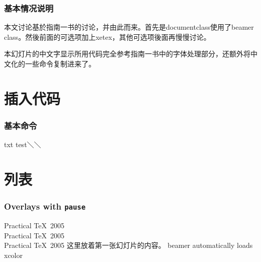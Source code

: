 \documentclass[xetex,aspectratio=169]{mybeamer}
\begin{document}
%
%
%


\begin{frame}
\frametitle{基本情况说明}
本文讨论基於\XeLaTeX 指南一书的讨论，并由此而来。首先是documentclass使用了beamer class。然後前面的可选项加上xetex，其他可选项後面再慢慢讨论。 

本幻灯片的中文字显示所用代码完全参考\XeLaTeX 指南一书中的字体处理部分，还额外将中文化的一些命令复制进来了。
\end{frame}

\section{插入代码}
\begin{frame}[fragile]
\frametitle{基本命令}
\begin{xverbatim}{txt}
test＼＼\
\end{xverbatim}
\end{frame}

\section{列表}
\begin{frame}
\frametitle{Overlays with {\tt pause}}
Practical \TeX\ 2005\\  \pause
Practical \TeX\ 2005\\ \pause
Practical \TeX\ 2005
这里放着第一张幻灯片的内容。 beamer automatically loads xcolor
\end{frame}
\end{document}
